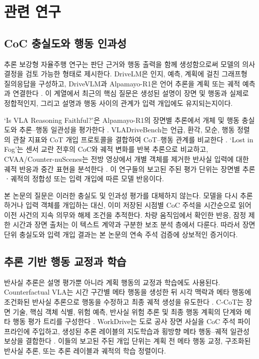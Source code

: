 \section{관련 연구}
\label{sec:related}

\subsection{CoC 충실도와 행동 인과성}
추론 보강형 자율주행 연구는 판단 근거와 행동 출력을 함께 생성함으로써 모델의 의사결정을 검토 가능한 형태로 제시한다. DriveLM은 인지, 예측, 계획에 걸친 그래프형 질의응답을 구성하고, DriveVLM과 Alpamayo-R1은 언어 추론을 계획 또는 궤적 예측과 연결한다 \cite{sima2024drivelm,tian2024drivevlm,wang2025alpamayo}. 이 계열에서 최근의 핵심 질문은 생성된 설명이 장면 및 행동과 실제로 정합적인지, 그리고 설명과 행동 사이의 관계가 입력 개입에도 유지되는지이다.

`Is VLA Reasoning Faithful?'은 Alpamayo-R1의 장면별 추론에서 개체 및 행동 충실도와 추론--행동 일관성을 평가한다 \cite{mayumu2026faithfulness}. VLADriveBench는 언급, 환각, 모순, 행동 정렬의 관찰 지표와 CoT 개입 프로토콜을 결합하여 CoT--행동 관계를 비교한다 \cite{nguyen2026vladrivebench}. `Lost in Fog'는 센서 교란 전후의 CoC와 궤적 변화를 반복 추론으로 비교하고, CVAA/Counter-nuScenes는 전방 영상에서 개별 객체를 제거한 반사실 입력에 대한 궤적 반응과 중간 표현을 분석한다 \cite{priyadershi2026lostinfog,panda2026cvaa}. 이 연구들의 보고된 주된 평가 단위는 장면별 추론ㆍ궤적의 정합성 또는 입력 개입에 따른 모델 반응이다.

본 논문의 질문은 이러한 충실도 및 인과성 평가를 대체하지 않는다. 모델을 다시 추론하거나 입력 객체를 개입하는 대신, 이미 저장된 시점별 CoC 주석을 시간순으로 읽어 이전 사건의 지속 의무와 해제 조건을 추적한다. 차량 움직임에서 확인한 반응, 잠정 제한 시간과 장면 출처는 이 텍스트 계약과 구분한 보조 분석 층에서 다룬다. 따라서 장면 단위 충실도와 입력 개입 결과는 본 논문의 연속 주석 검증에 상보적인 증거이다.

\subsection{추론 기반 행동 교정과 학습}
반사실 추론은 설명 평가뿐 아니라 계획 행동의 교정과 학습에도 사용된다. Counterfactual VLA는 시간 구간별 메타 행동을 생성한 뒤 시각 맥락과 메타 행동에 조건화된 반사실 추론으로 행동을 수정하고 최종 궤적 생성을 유도한다 \cite{peng2025counterfactualvla}. C-CoT는 장면 기술, 핵심 객체 식별, 위험 예측, 반사실 위험 추론 및 최종 행동 계획의 단계와 메타 행동 평가 트리를 구성한다 \cite{tian2026ccot}. WorkDrive는 도로 공사 장면 사실을 CoC 주석 파이프라인에 주입하고, 생성된 추론 레이블의 지도학습과 횡방향 메타 행동--궤적 일관성 보상을 결합한다 \cite{jiang2026workdrive}. 이들의 보고된 주된 개입 단위는 계획 전 메타 행동 교정, 구조화된 반사실 추론, 또는 추론 레이블과 궤적의 학습 정렬이다.

